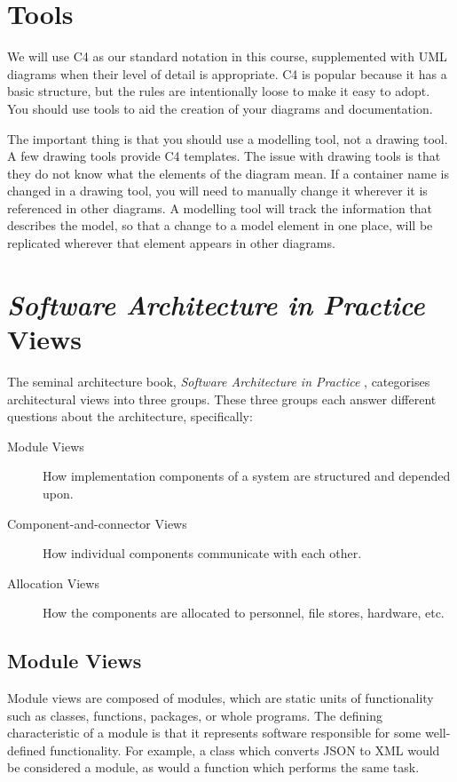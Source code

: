 \section{Tools}
We will use C4 as our standard notation in this course,
supplemented with UML diagrams when their level of detail is appropriate.
C4 is popular because it has a basic structure, but the rules are intentionally loose to make it easy to adopt.
You should use tools to aid the creation of your diagrams and documentation.

The important thing is that you should use a modelling tool, not a drawing tool.
A few drawing tools provide C4 templates.
The issue with drawing tools is that they do not know what the elements of the diagram mean.
If a container name is changed in a drawing tool, you will need to manually change it wherever it is referenced in other diagrams.
A modelling tool will track the information that describes the model, so that a change to a model element in one place,
will be replicated wherever that element appears in other diagrams.




\section{\textit{Software Architecture in Practice} Views}
The seminal architecture book, \textit{Software Architecture in Practice} \cite{bass2021software},
categorises architectural views into three groups.
These three groups each answer different questions about the architecture, specifically:
\begin{description}
    \item[Module Views] How implementation components of a system are structured and depended upon.
    \item[Component-and-connector Views] How individual components communicate with each other.
    \item[Allocation Views] How the components are allocated to personnel, file stores, hardware, etc.
\end{description}

\subsection{Module Views}
Module views are composed of modules, which are static units of functionality such as classes, functions, packages, or whole programs.
The defining characteristic of a module is that it represents software responsible for some well-defined functionality.
For example, a class which converts JSON to XML would be considered a module, as would a function which performs the same task.

